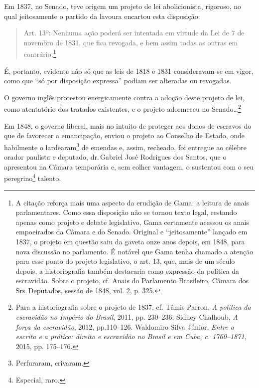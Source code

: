 Em 1837, no Senado, teve origem um projeto de lei abolicionista,
rigoroso, no qual jeitosamente o partido da lavoura encartou esta
disposição:

\begin{quote}
Art. 13º: Nenhuma ação poderá ser intentada em virtude da Lei de 7 de
novembro de 1831, que fica revogada, e bem assim todas as outras em
contrário.\footnote{A citação reforça mais uma aspecto da erudição de
  Gama: a leitura de anais parlamentares. Como essa disposição não se
  tornou texto legal, restando apenas como projeto e debate legislativo,
  Gama certamente acessou os anais empoeirados da Câmara e do Senado.
  Original e ``jeitosamente'' lançado em 1837, o projeto em questão saiu
  da gaveta onze anos depois, em 1848, para nova discussão no
  parlamento. É notável que Gama tenha chamado a atenção para esse ponto
  do projeto legislativo, o art. 13, que, mais de um século depois, a
  historiografia também destacaria como expressão da política da
  escravidão. Sobre o projeto, cf. Anais do Parlamento Brasileiro,
  Câmara dos Srs.\,Deputados, sessão de 1848, vol. 2, p. 325.}
\end{quote}

É, portanto, evidente não só que as leis de 1818 e 1831 consideravam-se
em vigor, como que ``só por disposição expressa'' podiam ser alteradas ou
revogadas.

O governo inglês protestou energicamente contra a adoção deste projeto
de lei, como atentatório dos tratados existentes, e o projeto adormeceu
no Senado\ldots{}\footnote{Para a historiografia sobre o projeto de 1837,
  cf. Tâmis Parron, \emph{A política da escravidão no Império do
  Brasil}, 2011, pp. 230--236; Sidney Chalhoub, \emph{A força da
  escravidão}, 2012, pp.110--126. Waldomiro Silva Júnior, \emph{Entre a
  escrita e a prática: direito e escravidão no Brasil e em Cuba, c.
  1760--1871}, 2015, pp. 175--176.}

Em 1848, o governo liberal, mais no intuito de proteger aos donos de
escravos do que de favorecer a emancipação, enviou o projeto ao Conselho
de Estado, onde habilmente o lardearam\footnote{Perfuraram, crivaram.}
de emendas e, assim, recheado, foi entregue ao célebre orador paulista e
deputado, dr.\,Gabriel José Rodrigues dos Santos, que o apresentou na
Câmara temporária e, sem colher vantagem, o sustentou com o seu
peregrino\footnote{Especial, raro.} talento.

